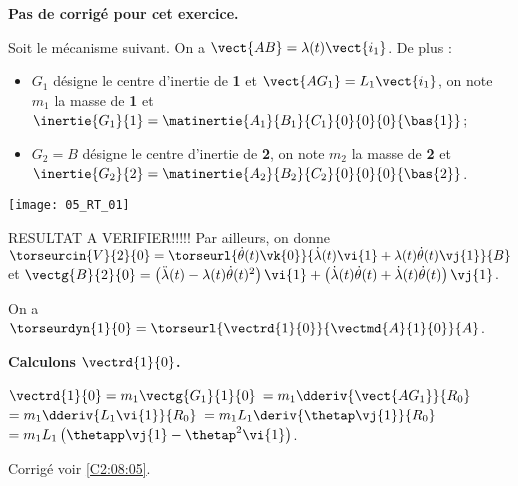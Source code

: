 \normaltrue
\correctionfalse


\setcounter{numques}{0}
\ifcorrection
\else
\textbf{Pas de corrigé pour cet exercice.}
\fi

\ifprof
\else
Soit le mécanisme suivant. On a $\vect{AB}=\lambda(t)\vect{i_1}$. De plus :
\begin{itemize}
\item $G_1$ désigne le centre d'inertie de \textbf{1} et $\vect{AG_1}=L_1\vect{i_1}$, on note $m_1$ la masse de \textbf{1} et $\inertie{G_1}{1}=\matinertie{A_1}{B_1}{C_1}{0}{0}{0}{\bas{1}}$; 
\item $G_2=B$ désigne le centre d'inertie de \textbf{2}, on note $m_2$ la masse de \textbf{2} et $\inertie{G_2}{2}=\matinertie{A_2}{B_2}{C_2}{0}{0}{0}{\bas{2}}$.
\end{itemize}
\begin{center}
\texttt{[image: 05\_RT\_01]}
\end{center}

\ifcolle
\else
RESULTAT A VERIFIER!!!!!
Par ailleurs, on donne $\torseurcin{V}{2}{0} =\torseurl{\dot{\theta}(t)\vk{0}}{\dot{\lambda}(t)\vi{1}+\lambda(t)\dot{\theta}(t)\vj{1}}{B}$ et $\vectg{B}{2}{0} =  \left( \ddot{\lambda}(t)-\lambda(t)\dot{\theta}(t)^2\right)\vi{1}  +  \left( \dot{\lambda}(t)\dot{\theta}(t) +\dot{\lambda}(t)\dot{\theta}(t)\right) \vj{1}$.
\fi

\fi




\ifprof
On a $\torseurdyn{1}{0} = \torseurl{\vectrd{1}{0}}{\vectmd{A}{1}{0}}{A}$.

\textbf{Calculons $\vectrd{1}{0}$.}

$\vectrd{1}{0} = m_1 \vectg{G_1}{1}{0}$ $=m_1\dderiv{\vect{AG_1}}{R_0}$
$=m_1\dderiv{L_1\vi{1}}{R_0}$
$=m_1L_1\deriv{\thetap\vj{1}}{R_0}$
$=m_1L_1\left( \thetapp \vj{1} - \thetap^2 \vi{1} \right)$.

\else
\fi

\ifprof

\else
\fi

\ifcolle
{}
\else
\fi

\ifprof
\else
\begin{flushright}
\footnotesize{Corrigé  voir \ref{C2:08:05}.}
\end{flushright}%
\fi